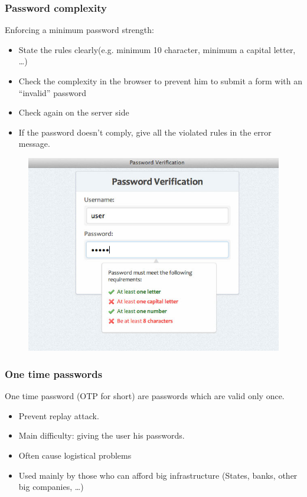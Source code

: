 \begin{frame}
\frametitle{Password complexity}

Enforcing a minimum password strength:
\begin{itemize}
\item State the rules clearly(e.g. minimum 10 character, minimum a
  capital letter, \ldots)
\item Check the complexity in the browser to prevent him to submit a
  form with an ``invalid'' password
\item Check again on the server side
\item If the password doesn't comply, give all the violated rules in
  the error message.
\end{itemize}

\begin{figure}
  \includegraphics[width= 0.3\linewidth]{img/browserPasswordValidation.jpg}
\end{figure}

\end{frame}



\begin{frame}
\frametitle{One time passwords}

One time password (OTP for short) are passwords which are valid only
once. 
\begin{itemize}
\item Prevent replay attack.
\item Main difficulty: giving the user his passwords. 
\item Often cause logistical problems 
\item Used mainly by those who can afford big infrastructure (States,
  banks, other big companies, \ldots)
\end{itemize}
\end{frame}


